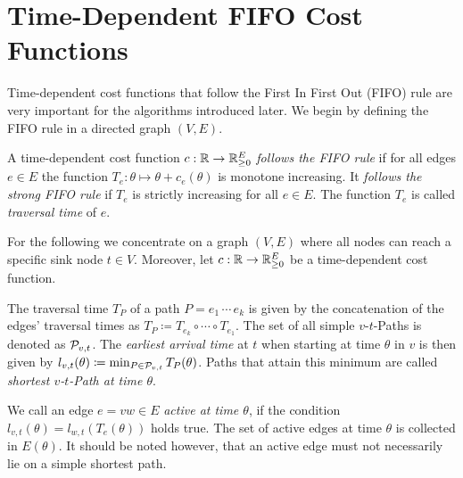\section{Time-Dependent FIFO Cost Functions}\label{sec:fifo-costs}

Time-dependent cost functions that follow the First In First Out (FIFO) rule are very important for the algorithms introduced later.
We begin by defining the FIFO rule in a directed graph $(V, E)$.


\begin{definition}
    A time-dependent cost function $c: \mathbb{R}\rightarrow \mathbb{R}_{\geq0}^E$ \emph{follows the FIFO rule} if for all edges $e\in E$ the function $T_e: \theta\mapsto \theta + c_e(\theta)$ is monotone increasing.
    It \emph{follows the strong FIFO rule} if $T_e$ is strictly increasing for all $e\in E$.
    The function $T_e$ is called \emph{traversal time} of $e$.
\end{definition}

For the following we concentrate on a graph $(V,E)$ where all nodes can reach a specific sink node $t\in V$.
Moreover, let $c:\mathbb{R}\rightarrow \mathbb{R}_{\geq0}^E$ be a time-dependent cost function.

The traversal time $T_P$ of a path $P = e_1\,\cdots\,e_k$ is given by the concatenation of the edges' traversal times as $T_P \coloneqq T_{e_k} \circ \cdots \circ T_{e_1}$.
The set of all simple $v$-$t$-Paths is denoted as $\mathcal{P}_{v,t}$.
The \emph{earliest arrival time} at $t$ when starting at time $\theta$ in $v$ is then given by $l_{v,t}(\theta)\coloneqq \min_{P\in\mathcal{P}_{v,t}} T_P(\theta)$.
Paths that attain this minimum are called \emph{shortest $v$-$t$-Path at time $\theta$}.

We call an edge $e=vw\in E$ \emph{active at time $\theta$}, if the condition $l_{v,t}(\theta) = l_{w,t}(T_e(\theta))$ holds true.
The set of active edges at time $\theta$ is collected in $E(\theta)$.
It should be noted however, that an active edge must not necessarily lie on a simple shortest path.







